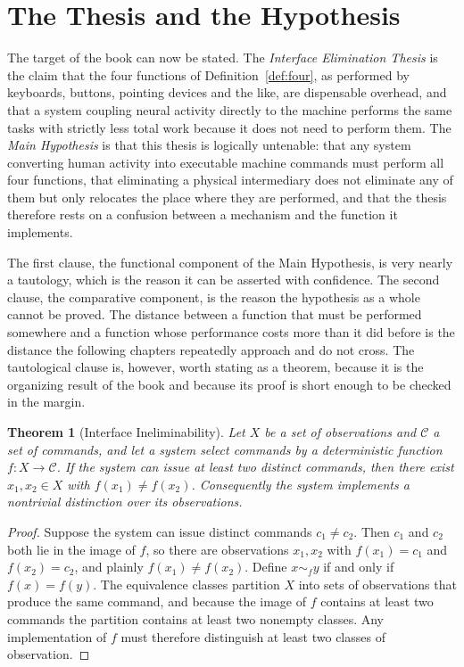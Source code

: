 \documentclass[11pt,twoside,openany]{book}
\newtheorem{theorem}{Theorem}[chapter]
\theoremstyle{definition}
\theoremstyle{remark}
\newcommand{\C}{\mathcal{C}}
\begin{document}
\section{The Thesis and the Hypothesis}

The target of the book can now be stated. The \emph{Interface Elimination Thesis} is the claim that the four functions of Definition~\ref{def:four}, as performed by keyboards, buttons, pointing devices and the like, are dispensable overhead, and that a system coupling neural activity directly to the machine performs the same tasks with strictly less total work because it does not need to perform them. The \emph{Main Hypothesis} is that this thesis is logically untenable: that any system converting human activity into executable machine commands must perform all four functions, that eliminating a physical intermediary does not eliminate any of them but only relocates the place where they are performed, and that the thesis therefore rests on a confusion between a mechanism and the function it implements.

The first clause, the functional component of the Main Hypothesis, is very nearly a tautology, which is the reason it can be asserted with confidence. The second clause, the comparative component, is the reason the hypothesis as a whole cannot be proved. The distance between a function that must be performed somewhere and a function whose performance costs more than it did before is the distance the following chapters repeatedly approach and do not cross. The tautological clause is, however, worth stating as a theorem, because it is the organizing result of the book and because its proof is short enough to be checked in the margin.

\begin{theorem}[Interface Ineliminability]\label{thm:ineliminable}
Let $X$ be a set of observations and $\C$ a set of commands, and let a system select commands by a deterministic function $f:X\to\C$. If the system can issue at least two distinct commands, then there exist $x_1,x_2\in X$ with $f(x_1)\neq f(x_2)$. Consequently the system implements a nontrivial distinction over its observations.
\end{theorem}
\begin{proof}
Suppose the system can issue distinct commands $c_1\neq c_2$. Then $c_1$ and $c_2$ both lie in the image of $f$, so there are observations $x_1,x_2$ with $f(x_1)=c_1$ and $f(x_2)=c_2$, and plainly $f(x_1)\neq f(x_2)$. Define $x\sim_f y$ if and only if $f(x)=f(y)$. The equivalence classes partition $X$ into sets of observations that produce the same command, and because the image of $f$ contains at least two commands the partition contains at least two nonempty classes. Any implementation of $f$ must therefore distinguish at least two classes of observation.
\end{proof}
\end{document}
